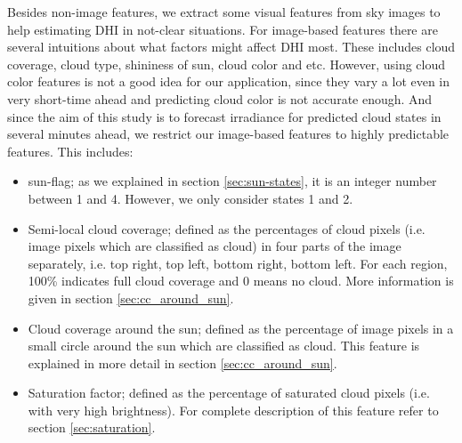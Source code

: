 Besides non-image features, we extract some visual features from sky images to help estimating DHI in not-clear situations. For image-based features there are several intuitions about what factors might affect DHI most. These includes cloud coverage, cloud type, shininess of sun, cloud color and etc. However, using cloud color features is not a good idea for our application, since they vary a lot even in very short-time ahead and predicting cloud color is not accurate enough. And since the aim of this study is to forecast irradiance for predicted cloud states in several minutes ahead, we restrict our image-based features to highly predictable features. This includes:
\begin{itemize}
\item sun-flag; as we explained in section \ref{sec:sun-states}, it is an integer number between 1 and 4. However, we only consider states 1 and 2. 
\item Semi-local cloud coverage; defined as the percentages of cloud pixels (i.e. image pixels which are classified as cloud) in four parts of the image separately, i.e. top right, top left, bottom right, bottom left. For each region, 100\% indicates full cloud coverage and 0 means no cloud. More information is given in section \ref{sec:cc_around_sun}.
\item Cloud coverage around the sun; defined as the percentage of image pixels in a small circle around the sun which are classified as cloud. This feature is explained in more detail in section \ref{sec:cc_around_sun}.
\item Saturation factor; defined as the percentage of saturated cloud pixels (i.e. with very high brightness). For complete description of this feature refer to section \ref{sec:saturation}.
\end{itemize}

